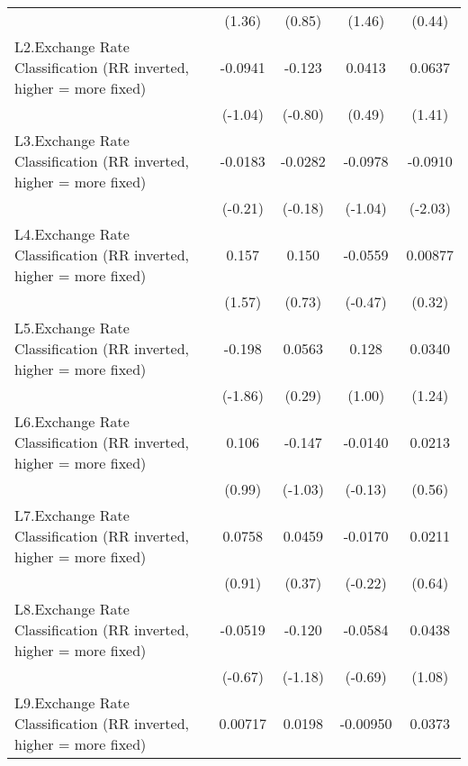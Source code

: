 {\begin{longtable}{l*{4}{c}}
                &   (1.36)         &   (0.85)         &   (1.46)         &   (0.44)         \\
[1em]
L2.Exchange Rate Classification (RR inverted, higher = more fixed)&  -0.0941         &   -0.123         &   0.0413         &   0.0637         \\
                &  (-1.04)         &  (-0.80)         &   (0.49)         &   (1.41)         \\
[1em]
L3.Exchange Rate Classification (RR inverted, higher = more fixed)&  -0.0183         &  -0.0282         &  -0.0978         &  -0.0910\sym{*}  \\
                &  (-0.21)         &  (-0.18)         &  (-1.04)         &  (-2.03)         \\
[1em]
L4.Exchange Rate Classification (RR inverted, higher = more fixed)&    0.157         &    0.150         &  -0.0559         &  0.00877         \\
                &   (1.57)         &   (0.73)         &  (-0.47)         &   (0.32)         \\
[1em]
L5.Exchange Rate Classification (RR inverted, higher = more fixed)&   -0.198         &   0.0563         &    0.128         &   0.0340         \\
                &  (-1.86)         &   (0.29)         &   (1.00)         &   (1.24)         \\
[1em]
L6.Exchange Rate Classification (RR inverted, higher = more fixed)&    0.106         &   -0.147         &  -0.0140         &   0.0213         \\
                &   (0.99)         &  (-1.03)         &  (-0.13)         &   (0.56)         \\
[1em]
L7.Exchange Rate Classification (RR inverted, higher = more fixed)&   0.0758         &   0.0459         &  -0.0170         &   0.0211         \\
                &   (0.91)         &   (0.37)         &  (-0.22)         &   (0.64)         \\
[1em]
L8.Exchange Rate Classification (RR inverted, higher = more fixed)&  -0.0519         &   -0.120         &  -0.0584         &   0.0438         \\
                &  (-0.67)         &  (-1.18)         &  (-0.69)         &   (1.08)         \\
[1em]
L9.Exchange Rate Classification (RR inverted, higher = more fixed)&  0.00717         &   0.0198         & -0.00950         &   0.0373         \\

\end{longtable}}
